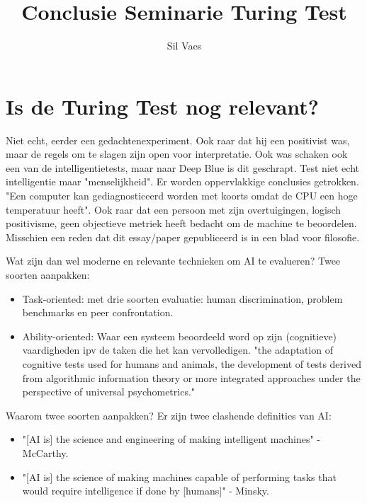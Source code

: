 \documentclass[11pt]{article}
\author{Sil Vaes}
\date{}
\title{Conclusie Seminarie Turing Test}
\begin{document}
\maketitle
\tableofcontents


\section{Is de Turing Test nog relevant?}
\label{sec:orgd485f4f}

Niet echt, eerder een gedachtenexperiment. Ook raar dat hij een positivist was, maar de regels om te slagen zijn open voor interpretatie. Ook was schaken ook een van de intelligentietests, maar naar Deep Blue is dit geschrapt. Test niet echt intelligentie maar "menselijkheid". Er worden oppervlakkige conclusies getrokken. "Een computer kan gediagnosticeerd worden met koorts omdat de CPU een hoge temperatuur heeft". Ook raar dat een persoon met zijn overtuigingen, logisch positivisme, geen objectieve metriek heeft bedacht om de machine te beoordelen. Misschien een reden dat dit essay/paper gepubliceerd is in een blad voor filosofie.

Wat zijn dan wel moderne en relevante technieken om AI te evalueren? Twee  soorten aanpakken:

\begin{itemize}
\item Task-oriented: met drie soorten evaluatie: human discrimination, problem benchmarks en peer confrontation.
\item Ability-oriented: Waar een systeem beoordeeld word op zijn (cognitieve) vaardigheden ipv de taken die het kan vervolledigen. "the adaptation of cognitive tests used for humans and animals, the development of tests derived from algorithmic information theory or more integrated approaches under the perspective of universal psychometrics."
\end{itemize}

Waarom twee soorten aanpakken? Er zijn twee clashende definities van AI:

\begin{itemize}
\item "[AI is] the science and engineering of making intelligent machines" - McCarthy.
\item "[AI is] the science of making machines capable of performing tasks that would require intelligence if done by [humans]" - Minsky.
\end{itemize}
\end{document}
